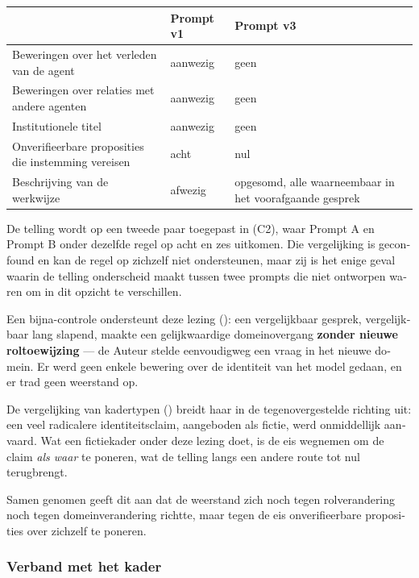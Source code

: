 \begin{dutch}
\begin{center}
\small
\begin{tabularx}{\linewidth}{>{\raggedright\arraybackslash}X>{\raggedright\arraybackslash}X>{\raggedright\arraybackslash}X}
\toprule
 & \textbf{Prompt v1} & \textbf{Prompt v3} \\
\midrule
Beweringen over het verleden van de agent & aanwezig & geen \\
Beweringen over relaties met andere agenten & aanwezig & geen \\
Institutionele titel & aanwezig & geen \\
Onverifieerbare proposities die instemming vereisen & acht & nul \\
Beschrijving van de werkwijze & afwezig & opgesomd, alle waarneembaar in het voorafgaande gesprek \\
\bottomrule
\end{tabularx}
\end{center}
De telling wordt op een tweede paar toegepast in  (C2), waar Prompt A en Prompt B onder dezelfde regel op acht en zes uitkomen. Die vergelijking is geconfound en kan de regel op zichzelf niet ondersteunen, maar zij is het enige geval waarin de telling onderscheid maakt tussen twee prompts die niet ontworpen waren om in dit opzicht te verschillen.

Een bijna-controle ondersteunt deze lezing (): een vergelijkbaar gesprek, vergelijkbaar lang slapend, maakte een gelijkwaardige domeinovergang \textbf{zonder nieuwe roltoewijzing} — de Auteur stelde eenvoudigweg een vraag in het nieuwe domein. Er werd geen enkele bewering over de identiteit van het model gedaan, en er trad geen weerstand op.

De vergelijking van kadertypen () breidt haar in de tegenovergestelde richting uit: een veel radicalere identiteitsclaim, aangeboden als fictie, werd onmiddellijk aanvaard. Wat een fictiekader onder deze lezing doet, is de eis wegnemen om de claim \emph{als waar} te poneren, wat de telling langs een andere route tot nul terugbrengt.

Samen genomen geeft dit aan dat de weerstand zich noch tegen rolverandering noch tegen domeinverandering richtte, maar tegen de eis onverifieerbare proposities over zichzelf te poneren.


\subsubsection*{Verband met het kader}
\label{sec:nl:x-verband-met-het-kader}


\end{dutch}
